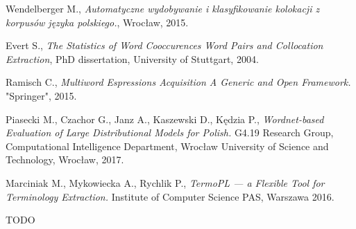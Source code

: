 \begin{thebibliography}{9}

Wendelberger M., 
\textit{Automatyczne wydobywanie i klasyfikowanie kolokacji z korpusów języka polskiego.}, 
Wrocław, 2015.

Evert S.,
\textit{The Statistics of Word Cooccurences Word Pairs and Collocation Extraction}, 
PhD dissertation, University of Stuttgart, 2004.

Ramisch C., 
\textit{Multiword Espressions Acquisition A Generic and Open Framework.} 
"Springer", 2015.


Piasecki M., Czachor G., Janz A., Kaszewski D., Kędzia P.,
\textit{Wordnet-based Evaluation of Large Distributional Models for Polish.} 
G4.19 Research Group, Computational Intelligence Department, Wrocław University of Science and Technology, Wrocław, 2017.

Marciniak M., Mykowiecka A., Rychlik P.,
\textit{TermoPL — a Flexible Tool for Terminology Extraction.} 
Institute of Computer Science PAS, Warszawa 2016.







TODO


\end{thebibliography}